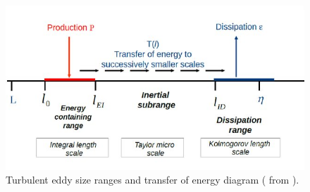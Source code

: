 \documentclass[../main.tex]{subfiles}
\begin{document}
\begin{figure}
\centering
\noindent \includegraphics[width=30pc]{gfx/Turb_lenthscales_Pope.jpg}
\caption{Turbulent eddy size ranges and transfer of energy diagram ( from \citet{Saeedipour2014}).}
\label{fig:ch1_01}
\end{figure}
\end{document}
